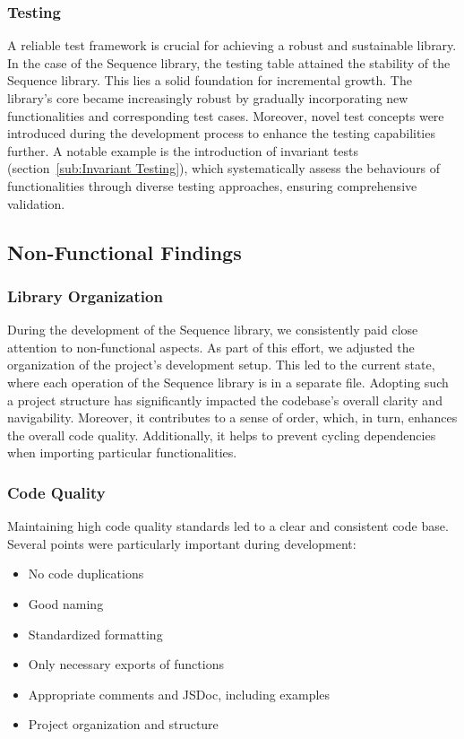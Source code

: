 \subsubsection{Testing}
\label{subsub:Testing}
A reliable test framework is crucial for achieving a robust and sustainable
library. In the case of the Sequence library, the testing table attained the
stability of the Sequence library. This lies a solid foundation for incremental
growth. The library's core became increasingly robust by gradually
incorporating new functionalities and corresponding test cases. Moreover, novel
test concepts were introduced during the development process to enhance the
testing capabilities further. A notable example is the introduction of
invariant tests (section~\ref{sub:Invariant Testing}), which systematically
assess the behaviours of functionalities through diverse testing approaches,
ensuring comprehensive validation.

\subsection{Non-Functional Findings}
\label{sub:Non-Functional Aspects}
\subsubsection{Library Organization}
\label{subsub:Library Organisation}
During the development of the Sequence library, we consistently paid close
attention to non-functional aspects. As part of this effort, we adjusted the
organization of the project's development setup. This led to the current state,
where each operation of the Sequence library is in a separate file. Adopting
such a project structure has significantly impacted the codebase's overall
clarity and navigability. Moreover, it contributes to a sense of order, which,
in turn, enhances the overall code quality. Additionally, it helps to prevent
cycling dependencies when importing particular functionalities.
\subsubsection{Code Quality}
\label{subsub:Code Quality}
Maintaining high code quality standards led to a clear and consistent
code base. Several points were particularly important during development:
\begin{itemize}
  \item{No code duplications}
  \item{Good naming}
  \item{Standardized formatting}
  \item{Only necessary exports of functions}
  \item{Appropriate comments and JSDoc, including examples}
  \item{Project organization and structure}
\end{itemize}


